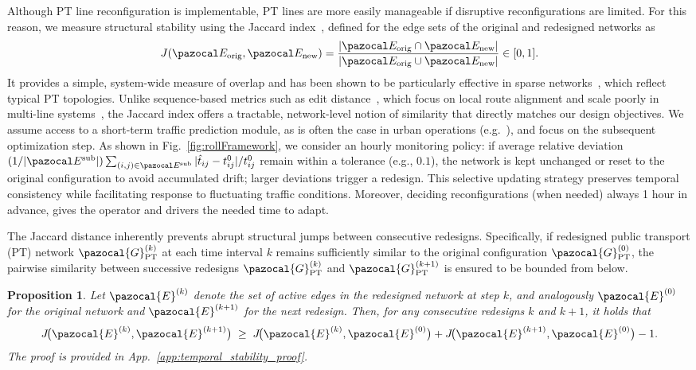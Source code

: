 \documentclass[a4paper,fleqn]{cas-sc}
\newtheorem{proposition}{Proposition}
\begin{document}
Although PT line reconfiguration is implementable, PT lines are more easily manageable if disruptive reconfigurations are limited. For this reason, we measure structural stability using the Jaccard index~\citep{jaccard1901etude}, defined for the edge sets of the original and redesigned networks as
\begin{equation}
J(\pazocal E_{\text{orig}},\pazocal E_{\text{new}})
=\frac{|\pazocal E_{\text{orig}}\cap \pazocal E_{\text{new}}|}
       {|\pazocal E_{\text{orig}}\cup \pazocal E_{\text{new}}|}\in[0,1].
\label{eq:jaccard}
\end{equation}
It provides a simple, system-wide measure of overlap and has been shown to be particularly effective in sparse networks~\citep{travieso2024analytical}, which reflect typical PT topologies. Unlike sequence-based metrics such as edit distance~\citep{cheng2025computing}, which focus on local route alignment and scale poorly in multi-line systems~\citep{jain2024graph}, the Jaccard index offers a tractable, network-level notion of similarity that directly matches our design objectives.
%
We assume access to a short-term traffic prediction module, as is often the case in urban operations (e.g.~\cite{MTASchedules,TfLLiveBusArrivals}), and focus on the subsequent optimization step. As shown in Fig.~\ref{fig:rollFramework}, we consider an hourly monitoring policy: if average relative deviation $(1/|\pazocal E^\text{sub}|)  \sum_{(i,j)\in\pazocal E^\text{sub}}|\hat t_{ij}-t_{ij}^0|/t_{ij}^0$ remain within a tolerance (e.g., $0.1$), the network is kept unchanged or reset to the original configuration to avoid accumulated drift; larger deviations trigger a redesign. This selective updating strategy preserves temporal consistency while facilitating response to fluctuating traffic conditions. Moreover, deciding reconfigurations (when needed) always 1 hour in advance, gives the operator and drivers the needed time to adapt.

The Jaccard distance inherently prevents abrupt structural jumps between consecutive redesigns.
Specifically, if redesigned public transport (PT) network $\pazocal{G}_\text{PT}^{(k)}$ at each time interval $k$ remains sufficiently similar to the original configuration $\pazocal{G}_\text{PT}^{(0)}$,
the pairwise similarity between successive redesigns $\pazocal{G}_\text{PT}^{(k)}$ and $\pazocal{G}_\text{PT}^{(k+1)}$ is ensured to be bounded from below.
%
\begin{proposition}
\label{prop:temporal_stability}
Let $\pazocal{E}^{(k)}$ denote the set of active edges in the redesigned network at step $k$, 
and analogously $\pazocal{E}^{(0)}$ for the original network and $\pazocal{E}^{(k+1)}$ for the next redesign. 
Then, for any consecutive redesigns $k$ and $k+1$, it holds that
\[
J\!\big(\pazocal{E}^{(k)}, \pazocal{E}^{(k+1)}\big)
\;\ge\;
J\!\big(\pazocal{E}^{(k)}, \pazocal{E}^{(0)}\big)
+
J\!\big(\pazocal{E}^{(k+1)}, \pazocal{E}^{(0)}\big)
- 1.
\]
The proof is provided in App.~\ref{app:temporal_stability_proof}.
\end{proposition}
\end{document}
